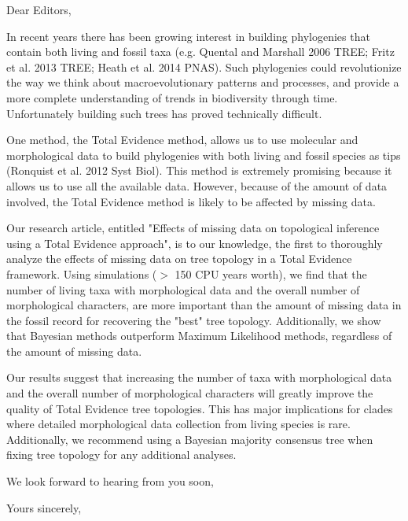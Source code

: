 \documentclass[11pt]{letter}
\begin{document}
\begin{letter}{}
\opening{Dear Editors,}

In recent years there has been growing interest in building phylogenies that contain both living and fossil taxa (e.g. Quental and Marshall 2006 TREE; Fritz et al. 2013 TREE; Heath et al. 2014 PNAS). Such phylogenies could revolutionize the way we think about macroevolutionary patterns and processes, and provide a more complete understanding of trends in biodiversity through time. Unfortunately building such trees has proved technically difficult. 

One method, the Total Evidence method, allows us to use molecular and morphological data to build phylogenies with both living and fossil species as tips (Ronquist et al. 2012 Syst Biol). This method is extremely promising because it allows us to use all the available data. However, because of the amount of data involved, the Total Evidence method is likely to be affected by missing data.

Our research article, entitled "Effects of missing data on topological inference using a Total Evidence approach", is to our knowledge, the first to thoroughly analyze the effects of missing data on tree topology in a Total Evidence framework. Using simulations ($>$ 150 CPU years worth), we find that the number of living taxa with morphological data and the overall number of morphological characters, are more important than the amount of missing data in the fossil record for recovering the "best" tree topology. Additionally, we show that Bayesian methods outperform Maximum Likelihood methods, regardless of the amount of missing data.

Our results suggest that increasing the number of taxa with morphological data and the overall number of morphological characters will greatly improve the quality of Total Evidence tree topologies. This has major implications for clades where detailed morphological data collection from living species is rare. Additionally, we recommend using a Bayesian majority consensus tree when fixing tree topology for any additional analyses.

We look forward to hearing from you soon,

\closing{Yours sincerely,}

\end{letter}
\end{document}
